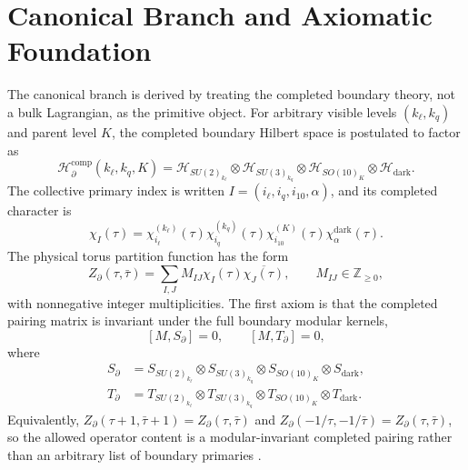 \documentclass[11pt,letterpaper]{article}
\theoremstyle{plain}
\newcommand{\kell}{k_{\ell}}
\newcommand{\kq}{k_q}
\newcommand{\Kpar}{K}
\newcommand{\Zboundary}{Z_{\partial}}
\begin{document}
\section{Canonical Branch and Axiomatic Foundation}
\label{sec:canonical-branch-axiomatic-foundation}

The canonical branch is derived by treating the completed boundary theory, not a
bulk Lagrangian, as the primitive object.  For arbitrary visible levels
$(\kell,\kq)$ and parent level $\Kpar$, the completed boundary Hilbert space is
postulated to factor as
\begin{equation}
\label{eq:completed-boundary-hilbert-general}
 \mathcal H_{\partial}^{\text{comp}}(\kell,\kq,\Kpar)
 =
 \mathcal H_{SU(2)_{\kell}}
 \otimes
 \mathcal H_{SU(3)_{\kq}}
 \otimes
 \mathcal H_{SO(10)_{\Kpar}}
 \otimes
 \mathcal H_{\text{dark}}.
\end{equation}
The collective primary index is written
$I=(i_{\ell},i_q,i_{10},\alpha)$, and its completed character is
\begin{equation}
\label{eq:completed-character-general}
 \chi_I(\tau)
 =
 \chi^{(\kell)}_{i_{\ell}}(\tau)
 \chi^{(\kq)}_{i_q}(\tau)
 \chi^{(\Kpar)}_{i_{10}}(\tau)
 \chi^{\text{dark}}_{\alpha}(\tau).
\end{equation}
The physical torus partition function has the form
\begin{equation}
\label{eq:zboundary-section-two}
 \Zboundary(\tau,\bar\tau)
 =
 \sum_{I,J}M_{IJ}\chi_I(\tau)\overline{\chi_J(\tau)},
 \qquad
 M_{IJ}\in\mathbb Z_{\ge0},
\end{equation}
with nonnegative integer multiplicities.  The first axiom is that the completed
pairing matrix is invariant under the full boundary modular kernels,
\begin{equation}
\label{eq:section-two-modular-invariance}
 [M,S_{\partial}]=0,
 \qquad
 [M,T_{\partial}]=0,
\end{equation}
where
\begin{align}
\label{eq:section-two-modular-kernels}
 S_{\partial}
 &=
 S_{SU(2)_{\kell}}
 \otimes S_{SU(3)_{\kq}}
 \otimes S_{SO(10)_{\Kpar}}
 \otimes S_{\text{dark}},\nonumber\\
 T_{\partial}
 &=
 T_{SU(2)_{\kell}}
 \otimes T_{SU(3)_{\kq}}
 \otimes T_{SO(10)_{\Kpar}}
 \otimes T_{\text{dark}}.
\end{align}
Equivalently,
$\Zboundary(\tau+1,\bar\tau+1)=\Zboundary(\tau,\bar\tau)$ and
$\Zboundary(-1/\tau,-1/\bar\tau)=\Zboundary(\tau,\bar\tau)$, so the allowed
operator content is a modular-invariant completed pairing rather than an
arbitrary list of boundary primaries \cite{cardy1986,cappelli1987}.
\end{document}
